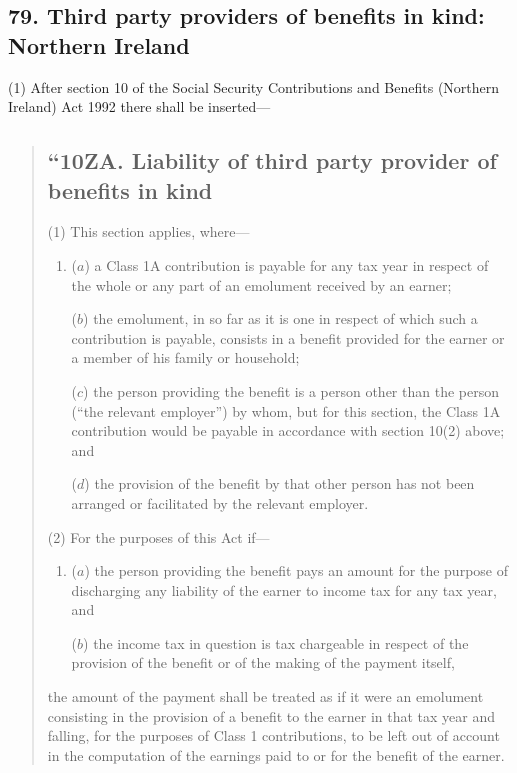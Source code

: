 \documentclass[12pt,a4paper]{article}
\begin{document}
\subsection{79. Third party providers of benefits in kind: Northern Ireland}

(1) After section 10 of the Social Security Contributions and Benefits (Northern Ireland) Act 1992 there shall be inserted—
\begin{quotation}
\subsection*{“10ZA. Liability of third party provider of benefits in kind}

(1) This section applies, where—
\begin{enumerate}\item[]
($a$) a Class 1A contribution is payable for any tax year in respect of the whole or any part of an emolument received by an earner;

($b$) the emolument, in so far as it is one in respect of which such a contribution is payable, consists in a benefit provided for the earner or a member of his family or household;

($c$) the person providing the benefit is a person other than the person (“the relevant employer”) by whom, but for this section, the Class 1A contribution would be payable in accordance with section 10(2)  above; and

($d$) the provision of the benefit by that other person has not been arranged or facilitated by the relevant employer.
\end{enumerate}

(2) For the purposes of this Act if—
\begin{enumerate}\item[]
($a$) the person providing the benefit pays an amount for the purpose of discharging any liability of the earner to income tax for any tax year, and

($b$) the income tax in question is tax chargeable in respect of the provision of the benefit or of the making of the payment itself,
\end{enumerate}
the amount of the payment shall be treated as if it were an emolument consisting in the provision of a benefit to the earner in that tax year and falling, for the purposes of Class 1 contributions, to be left out of account in the computation of the earnings paid to or for the benefit of the earner.


\end{quotation}
\end{document}
